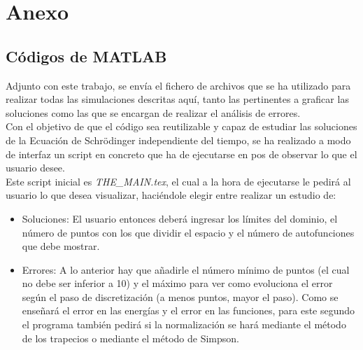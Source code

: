 \documentclass[12pt]{article}
\begin{document}
\newpage
\section{Anexo}
\subsection{Códigos de MATLAB}
Adjunto con este trabajo, se envía el fichero de archivos que se ha utilizado para realizar todas las simulaciones descritas aquí, tanto las pertinentes a graficar las soluciones como las que se encargan de realizar el análisis de errores.\\

Con el objetivo de que el código sea reutilizable y capaz de estudiar las soluciones de la Ecuación de Schrödinger independiente del tiempo, se ha realizado a modo de interfaz un script en concreto que ha de ejecutarse en pos de observar lo que el usuario desee.\\

Este script inicial es \textit{THE\_MAIN.tex}, el cual a la hora de ejecutarse le pedirá al usuario lo que desea visualizar, haciéndole elegir entre realizar un estudio de:

\begin{itemize}
    \item Soluciones: El usuario entonces deberá ingresar los límites del dominio, el número de puntos con los que dividir el espacio y el número de autofunciones que debe mostrar.

    \item Errores: A lo anterior hay que añadirle el número mínimo de puntos (el cual no debe ser inferior a 10) y el máximo para ver como evoluciona el error según el paso de discretización (a menos puntos, mayor el paso). Como se enseñará el error en las energías y el error en las funciones, para este segundo el programa también pedirá si la normalización se hará mediante el método de los trapecios o mediante el método de Simpson.

\end{itemize}

\nocite{*}
\printbibliography
\end{document}
